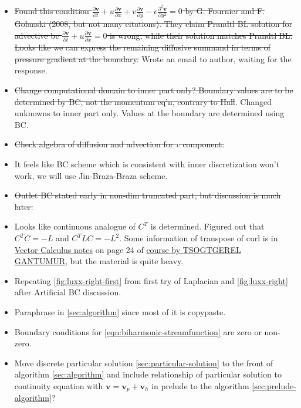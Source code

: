 \documentclass{article}
\numberwithin{equation}{section}
\begin{document}
{\begin{itemize}
    \item  \st{Found this condition $\frac{\partial \boldsymbol{v}}{\partial t}+u \frac{\partial \boldsymbol{v}}{\partial x}+v \frac{\partial \boldsymbol{v}}{\partial y}-\epsilon \frac{\partial^2 \boldsymbol{v}}{\partial y^2}=0$ by G. Fournier and F. Golanski (2008, but not many citations). They claim Prandtl BL solution for advective bc $\frac{\partial \boldsymbol{v}}{\partial t} + u\frac{\partial \boldsymbol{v}}{\partial x}=0$ is wrong, while their solution matches Prandtl BL. Looks like we can express the remaining diffusive summand in terms of pressure gradient at the boundary.} Wrote an email to author, waiting for the response. 
    \item \st{Change computational domain to inner part only? Boundary values are to be determined by BC, not the momentum eq'n, contrary to Hall}\cite{Hall:1980}. Changed unknowns to inner part only. Values at the boundary are determined using BC. 
    \item \st{Check algebra of diffusion and advection for $v$ component.} 
    \item It feels like BC scheme which is consistent with inner discretization won't work, we will use Jin-Braza-Braza scheme. 
    \item \st{Outlet BC stated early in non-dim truncated part, but discussion is much later.}
    \item Looks like continuous analogue of $C^T$ is determined. Figured out that $C^TC=-L$ and $C^TLC=-L^2$. Some information of transpose of curl is in \href{https://www.math.mcgill.ca/gantumur/math248f19/vectorcalc.pdf}{Vector Calculus notes} on page 24 of \href{https://www.math.mcgill.ca/gantumur/math248f19/}{course by TSOGTGEREL GANTUMUR}, but the material is quite heavy.
    \item Repeating \cref{fig:luxx-right-first} from first try of Laplacian and \cref{fig:luxx-right} after Artificial BC discussion.
    \item Paraphrase \cite{Gamtumur:2019} in \cref{sec:algorithm} since most of it is copypaste.
    \item Boundary conditions for \cref{eqn:biharmonic-streamfunction} are zero or non-zero.
    \item Move discrete particular solution \cref{sec:particular-solution} to the front of algorithm \cref{sec:algorithm} and include relationship of particular solution to continuity equation with $\boldsymbol{v}=\boldsymbol{v}_p+\boldsymbol{v}_h$ in prelude to the algorithm \cref{sec:prelude-algorithm}?
  \end{itemize}
}
\end{document}
